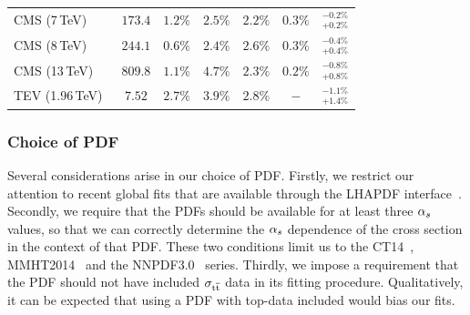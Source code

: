 \begin{table}[ht]
\begin{tabular}{l c c c c c c }
    CMS   (7\,TeV)~\cite{Khachatryan:2016mqs}             & $173.4  $ & $1.2 \%$  & $2.5 \%$  & $2.2 \%$  & $0.3 \%$  & ${}^{-0.2\%}_{+0.2\%}$         \\
    CMS   (8\,TeV)~\cite{Khachatryan:2016mqs}             & $244.1  $ & $0.6 \%$  & $2.4 \%$  & $2.6 \%$  & $0.3 \%$  & ${}^{-0.4\%}_{+0.4\%}$         \\
    CMS   (13\,TeV)~\cite{Khachatryan:2015uqb}            & $809.8  $ & $1.1 \%$  & $4.7 \%$  & $2.3 \%$  & $0.2 \%$  & ${}^{-0.8\%}_{+0.8\%}$         \\
    TEV   (1.96\,TeV)~\cite{Aaltonen:2013wca}  & $7.52   $ & $2.7 \%$  & $3.9 \%$  & $2.8 \%$  & $-$  & ${}^{-1.1\%}_{+1.4\%}$         \\
    \end{tabular}
\end{table}


\subsubsection{Choice of PDF}
\label{sec:pdf-choice}

Several considerations arise in our choice of PDF. 
%
Firstly, we restrict our attention to recent global fits that are
available through the LHAPDF interface~\cite{Buckley:2014ana}.
%
Secondly, we require that the PDFs should be available for at least
three $\alpha_s$ values, so that we can correctly determine the $\alpha_s$
dependence of the cross section in the context of that PDF.
%
These two conditions limit us to the CT14~\cite{Dulat:2015mca},
MMHT2014~\cite{Harland-Lang:2014zoa} and the NNPDF3.0~\cite{Ball:2014uwa} series.
%
Thirdly, we impose a requirement that the PDF should not have included
$\sigma_{\mathrm{t}\overline{\mathrm{t}}}$ data in its fitting procedure.
%
% 
Qualitatively, it can be expected that using a PDF with top-data included would bias our fits.


